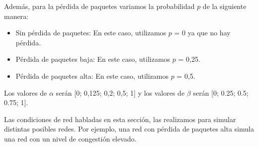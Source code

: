 Además, para la pérdida de paquetes variamos la probabilidad $p$ de la siguiente manera:
\begin{itemize}
 \item Sin pérdida de paquetes: En este caso, utilizamos $p$ = 0 ya que no hay pérdida. 
 \item Pérdida de paquetes baja: En este caso, utilizamos $p$ = 0,25.
 \item Pérdida de paquetes alta: En este caso, utilizamos $p$ = 0,5.
\end{itemize}

Los valores de $\alpha$ serán [0; 0,125; 0,2; 0,5; 1] y los valores de $\beta$ serán [0; 0.25; 0.5; 0.75; 1].

Las condiciones de red habladas en esta sección, las realizamos para simular distintas posibles redes. Por ejemplo, una red con pérdida de paquetes alta simula una red con un nivel de congestión elevado.